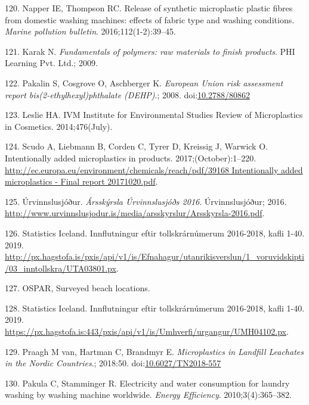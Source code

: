 \documentclass[icelandic,]{book}
\begin{document}
\leavevmode\hypertarget{ref-napper2016release}{}%
120. Napper IE, Thompson RC. Release of synthetic microplastic plastic fibres from domestic washing machines: effects of fabric type and washing conditions. \emph{Marine pollution bulletin}. 2016;112(1-2):39--45.

\leavevmode\hypertarget{ref-karak2009fundamentals}{}%
121. Karak N. \emph{Fundamentals of polymers: raw materials to finish products}. PHI Learning Pvt. Ltd.; 2009.

\leavevmode\hypertarget{ref-Pakalin2008}{}%
122. Pakalin S, Cosgrove O, Aschberger K. \emph{European Union risk assessment report bis(2-ethylhexyl)phthalate (DEHP)}.; 2008. doi:\href{https://doi.org/10.2788/80862}{10.2788/80862}

\leavevmode\hypertarget{ref-Leslie2014}{}%
123. Leslie HA. IVM Institute for Environmental Studies Review of Microplastics in Cosmetics. 2014;476(July).

\leavevmode\hypertarget{ref-Scudo2017}{}%
124. Scudo A, Liebmann B, Corden C, Tyrer D, Kreissig J, Warwick O. Intentionally added microplastics in products. 2017;(October):1--220. \href{http://ec.europa.eu/environment/chemicals/reach/pdf/39168\%20Intentionally\%20added\%20microplastics\%20-\%20Final\%20report\%2020171020.pdf}{http://ec.europa.eu/environment/chemicals/reach/pdf/39168 Intentionally added microplastics - Final report 20171020.pdf}.

\leavevmode\hypertarget{ref-Urvinnslusjouxf0ur2016}{}%
125. Úrvinnslusjóður. \emph{Ársskýrsla Úrvinnslusjóðs 2016}. Úrvinnslusjóður; 2016. \url{http://www.urvinnslusjodur.is/media/arsskyrslur/Arsskyrsla-2016.pdf}.

\leavevmode\hypertarget{ref-tollurinn}{}%
126. Statistics Iceland. Innflutningur eftir tollskrárnúmerum 2016-2018, kafli 1-40. 2019. \url{http://px.hagstofa.is/pxis/api/v1/is/Efnahagur/utanrikisverslun/1_voruvidskipti/03_inntollskra/UTA03801.px}.

\leavevmode\hypertarget{ref-ospar2019}{}%
127. OSPAR, Surveyed beach locations.

\leavevmode\hypertarget{ref-tollurinn2}{}%
128. Statistics Iceland. Innflutningur eftir tollskrárnúmerum 2016-2018, kafli 1-40. 2019. \url{https://px.hagstofa.is:443/pxis/api/v1/is/Umhverfi/urgangur/UMH04102.px}.

\leavevmode\hypertarget{ref-Praagh1277395}{}%
129. Praagh M van, Hartman C, Brandmyr E. \emph{Microplastics in Landfill Leachates in the Nordic Countries}.; 2018:50. doi:\href{https://doi.org/10.6027/TN2018-557}{10.6027/TN2018-557}

\leavevmode\hypertarget{ref-pakula2010electricity}{}%
130. Pakula C, Stamminger R. Electricity and water consumption for laundry washing by washing machine worldwide. \emph{Energy Efficiency}. 2010;3(4):365--382.
\end{document}
